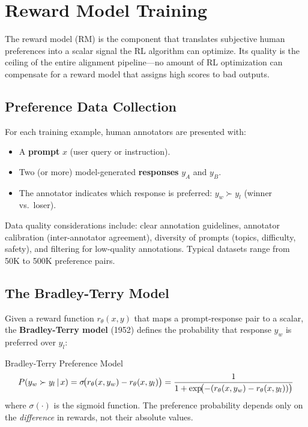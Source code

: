 \section{Reward Model Training}
\label{sec:reward_model}

The reward model (RM) is the component that translates subjective human
preferences into a scalar signal the RL algorithm can optimize.  Its quality
is the ceiling of the entire alignment pipeline---no amount of RL
optimization can compensate for a reward model that assigns high scores to
bad outputs.

\subsection{Preference Data Collection}

For each training example, human annotators are presented with:
\begin{itemize}[leftmargin=*]
\item A \textbf{prompt} $x$ (user query or instruction).
\item Two (or more) model-generated \textbf{responses} $y_A$ and $y_B$.
\item The annotator indicates which response is preferred: $y_w \succ y_l$
  (winner vs.\ loser).
\end{itemize}

Data quality considerations include: clear annotation guidelines, annotator
calibration (inter-annotator agreement), diversity of prompts (topics,
difficulty, safety), and filtering for low-quality annotations.  Typical
datasets range from 50K to 500K preference pairs.

\subsection{The Bradley-Terry Model}

Given a reward function $r_\theta(x, y)$ that maps a prompt-response pair
to a scalar, the \textbf{Bradley-Terry model} (1952) defines the
probability that response $y_w$ is preferred over $y_l$:

\begin{mathresult}{Bradley-Terry Preference Model}
\begin{equation}
P(y_w \succ y_l \,|\, x)
= \sigma\!\bigl(r_\theta(x, y_w) - r_\theta(x, y_l)\bigr)
= \frac{1}{1 + \exp\!\bigl(-(r_\theta(x, y_w) - r_\theta(x, y_l))\bigr)}
\label{eq:bradley_terry}
\end{equation}
where $\sigma(\cdot)$ is the sigmoid function.  The preference probability
depends only on the \emph{difference} in rewards, not their absolute values.
\end{mathresult}

